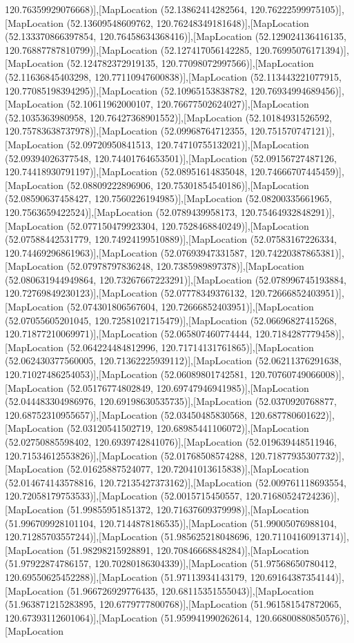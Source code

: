 120.76359929076668)],[MapLocation (52.13862414282564, 120.76222599975105)],[MapLocation (52.13609548609762, 120.76248349181648)],[MapLocation (52.133370866397854, 120.76458634368416)],[MapLocation (52.129024136416135, 120.76887787810799)],[MapLocation (52.127417056142285, 120.76995076171394)],[MapLocation (52.124782372919135, 120.77098072997566)],[MapLocation (52.11636845403298, 120.77110947600838)],[MapLocation (52.113443221077915, 120.77085198394295)],[MapLocation (52.10965153838782, 120.76934994689456)],[MapLocation (52.10611962000107, 120.76677502624027)],[MapLocation (52.1035363980958, 120.76427368901552)],[MapLocation (52.10184931526592, 120.75783638737978)],[MapLocation (52.09968764712355, 120.751570747121)],[MapLocation (52.09720950841513, 120.74710755132021)],[MapLocation (52.09394026377548, 120.74401764653501)],[MapLocation (52.09156727487126, 120.74418930791197)],[MapLocation (52.08951614835048, 120.74666707445459)],[MapLocation (52.08809222896906, 120.75301854540186)],[MapLocation (52.08590637458427, 120.7560226194985)],[MapLocation (52.08200335661965, 120.7563659422524)],[MapLocation (52.0789439958173, 120.75464932848291)],[MapLocation (52.077150479923304, 120.7528468840249)],[MapLocation (52.07588442531779, 120.74924199510889)],[MapLocation (52.07583167226334, 120.74469296861963)],[MapLocation (52.07693947331587, 120.74220387865381)],[MapLocation (52.07978797836248, 120.7385989897378)],[MapLocation (52.080631944949864, 120.73267667223291)],[MapLocation (52.078996745193884, 120.72769849230123)],[MapLocation (52.07778349376132, 120.72666852403951)],[MapLocation (52.074301806567604, 120.72666852403951)],[MapLocation (52.07055605201045, 120.72581021715479)],[MapLocation (52.06696827415268, 120.71877210069971)],[MapLocation (52.065807460774444, 120.7184287779458)],[MapLocation (52.064224484812996, 120.71714131761865)],[MapLocation (52.062430377560005, 120.71362225939112)],[MapLocation (52.06211376291638, 120.71027486254053)],[MapLocation (52.06089801742581, 120.70760749066008)],[MapLocation (52.05176774802849, 120.69747946941985)],[MapLocation (52.044483304986976, 120.69198630535735)],[MapLocation (52.0370920768877, 120.68752310955657)],[MapLocation (52.03450485830568, 120.687780601622)],[MapLocation (52.03120541502719, 120.68985441106072)],[MapLocation (52.02750885598402, 120.6939742841076)],[MapLocation (52.019639448511946, 120.71534612553826)],[MapLocation (52.01768508574288, 120.71877935307732)],[MapLocation (52.01625887524077, 120.72041013615838)],[MapLocation (52.014674143578816, 120.72135427373162)],[MapLocation (52.009761118693554, 120.72058179753533)],[MapLocation (52.0015715450557, 120.71680524724236)],[MapLocation (51.99855951851372, 120.71637609379998)],[MapLocation (51.996709928101104, 120.7144878186535)],[MapLocation (51.99005076988104, 120.71285703557244)],[MapLocation (51.985625218048696, 120.71104160913714)],[MapLocation (51.98298215928891, 120.70846668848284)],[MapLocation (51.97922874786157, 120.70280186304339)],[MapLocation (51.97568650780412, 120.69550625452288)],[MapLocation (51.97113934143179, 120.69164387354144)],[MapLocation (51.966726929776435, 120.68115351555043)],[MapLocation (51.963871215283895, 120.6779777800768)],[MapLocation (51.961581547872065, 120.67393112601064)],[MapLocation (51.959941990262614, 120.66800880850576)],[MapLocation 